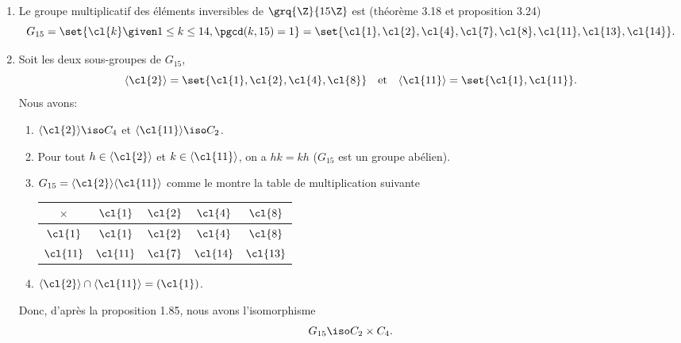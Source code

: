 \begin{enumerate}
  \item
    Le groupe multiplicatif des éléments inversibles de $\grq{\Z}{15\Z}$ est
    (théorème 3.18 et proposition 3.24)
    \[
      G_{15} 
        = \set{\cl{k} \given 1\leq k\leq 14, \pgcd(k,15)=1}
        = \set{
            \cl{1},\cl{2},\cl{4},\cl{7},\cl{8},\cl{11},\cl{13},\cl{14}
          }.
    \]
  \item
    Soit les deux sous-groupes de $G_{15}$,
    \[
      \langle\cl{2}\rangle = \set{\cl{1},\cl{2},\cl{4},\cl{8}}
      \quad\text{et}\quad
      \langle\cl{11}\rangle = \set{\cl{1},\cl{11}}.
    \]
    Nous avons:

    \begin{enumerate}[1)]
      \item
        $\langle\cl{2}\rangle \iso C_4$ et $\langle\cl{11}\rangle \iso C_2$.
      \item
        Pour tout $h\in\langle\cl{2}\rangle$ et $k\in\langle\cl{11}\rangle$, on
        a $hk = kh$ ($G_{15}$ est un groupe abélien).
      \item
        $G_{15} = \langle\cl{2}\rangle \langle\cl{11}\rangle$ comme le montre la
        table de multiplication suivante
        
        \begin{center}
          \begin{tabular}{c|cccc}
            $\times$  & $\cl{1}$  & $\cl{2}$ & $\cl{4}$  & $\cl{8}$ \\
            \midrule
            $\cl{1}$  & $\cl{1}$  & $\cl{2}$ & $\cl{4}$  & $\cl{8}$ \\
            $\cl{11}$ & $\cl{11}$ & $\cl{7}$ & $\cl{14}$ & $\cl{13}$
          \end{tabular}
        \end{center}

      \item
        $\langle\cl{2}\rangle \cap \langle\cl{11}\rangle = (\cl{1})$.
    \end{enumerate}
    
    Donc, d'après la proposition 1.85, nous avons l'isomorphisme
    \[
      G_{15} \iso C_2 \times C_4.
    \]
\end{enumerate}
